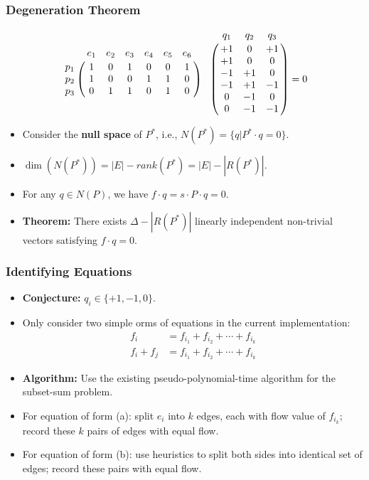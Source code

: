 \frame
{
	\frametitle{Degeneration Theorem}

	\vspace{0.4cm}
	

	\vspace{-0.4cm}

	\begin{displaymath}
	\bordermatrix{
		~   & e_1 & e_2 & e_3 & e_4 & e_5 & e_6\cr
		p_1 & 1 & 0 & 1 & 0 & 0 & 1 \cr
		p_2 & 1 & 0 & 0 & 1 & 1 & 0 \cr
		p_3 & 0 & 1 & 1 & 0 & 1 & 0 \cr
	} 
	\bordermatrix{
   	   ~& q_1 & q_2 & q_3 \cr
		& +1 &  0 & +1  \cr
		& +1 &  0 &  0  \cr
		& -1 & +1 &  0  \cr
		& -1 & +1 & -1  \cr
		&  0 & -1 &  0  \cr
		&  0 & -1 & -1  \cr
	} = 0
	\end{displaymath}

	\begin{itemize}
	\item Consider the {\bf null space} of $P^*$, i.e., $N(P^*) = \{q | P^*\cdot q = 0\}$.
	\item $\dim(N(P^*)) = |E| - rank(P^*) = |E| - |R(P^*)|$. 
	\item For any $q\in N(P)$, we have $f\cdot q = s\cdot P \cdot q = 0$. 
	\item {\bf Theorem:} There exists $\Delta - |R(P^*)|$ linearly independent non-trivial vectors
	satisfying $f\cdot q = 0$.
	\end{itemize}
}

\frame
{
	\frametitle{Identifying Equations}
	\begin{itemize}
	\item {\bf Conjecture:} $q_i \in \{+1, -1, 0\}$.
	\vspace{0.2cm}
	\item Only consider two simple orms of equations in the current implementation:
		\begin{align}
		f_i & =  f_{i_1} + f_{i_2} + \cdots + f_{i_k} \tag{a}\\
		f_i + f_j & = f_{i_1} + f_{i_2} + \cdots + f_{i_k} \tag{b}
		\end{align}
	\item {\bf Algorithm:} Use the existing pseudo-polynomial-time algorithm for the subset-sum problem.
	\vspace{0.2cm}
	\item For equation of form (a): split $e_i$ into $k$ edges, each with flow
	value of $f_{i_k}$; record these $k$ pairs of edges with equal flow.
	\vspace{0.2cm}
	\item For equation of form (b): use heuristics to split both sides into
			identical set of edges; record these pairs with equal flow.
	\end{itemize}
}


